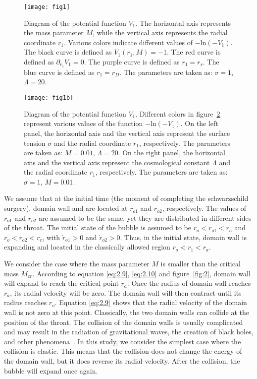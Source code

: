 \documentclass[12pt]{article}
\begin{document}
\begin{figure}[tbp]
\centering
\texttt{[image: fig1]}
\caption{\label{fig:3}Diagram of the potential function $V_{1}$. The horizontal axis represents the mass parameter $M$, while the vertical axis represents the radial coordinate $r_{1}$. Various colors indicate different values of $-\mathrm{ln}(-V_{1})$. The black curve is defined as $V_{1}(r_{1},M)=-1$. The red curve is defined as $\partial_{r_{1}}V_{1}=0$. The purple curve is defined as $r_{1}=r_{s}$. The blue curve is defined as $r_{1}=r_{D}$. The parameters are taken as: $\sigma=1$, $\Lambda=20$. }
\end{figure}

\begin{figure}[tbp]
\centering
\texttt{[image: fig1b]}
\caption{\label{fig:4} Diagram of the potential function $V_{1}$. Different colors in figure~\ref{fig:4} represent various values of the function $-\mathrm{ln}(-V_{1})$. On the left panel, the horizontal axis and the vertical axis represent the surface tension $\sigma$ and the radial coordinate $r_{1}$, respectively. The parameters are taken as: $M=0.01$, $\Lambda=20$. On the right panel, the horizontal axis and the vertical axis represent the cosmological constant $\Lambda$ and the radial coordinate $r_{1}$, respectively. The parameters are taken as: $\sigma=1$, $M=0.01$.}
\end{figure}

We assume that at the initial time (the moment of completing the schwarzschild surgery), domain wall \uppercase\expandafter{} and \uppercase\expandafter{} are located at $r_{o1}$ and $r_{o2}$, respectively. The values of $r_{o1}$ and $r_{o2}$ are assumed to be the same, yet they are distributed in different sides of the throat. The initial state of the bubble is assumed to be  $r_{o}<r_{o1}<r_{a}$ and  $r_{o}<r_{o2}<r_{c}$, with $\dot{r}_{o1}>0$ and $\dot{r}_{o2}>0$. Thus, in the initial state, domain wall \uppercase\expandafter{} is expanding and located in the classically allowed region $r_{o}<r_{1}<r_{a}$.

We consider the case where the mass parameter $M$ is smaller than the critical mass $M_{cr}$. According to equation \eqref{eq:2.9}, \eqref{eq:2.10} and figure~\ref{fig:2}, domain wall \uppercase\expandafter{} will expand to reach the critical point $r_{a}$. Once the radius of domain wall \uppercase\expandafter{} reaches $r_{a}$, its radial velocity will be zero. The domain wall \uppercase\expandafter{} will then contract until its radius reaches  $r_{o}$. Equation \eqref{eq:2.9} shows that the radial velocity of the domain wall  is not zero at this point. Classically, the two domain walls can  collide at the position of the throat. The collision of the domain walls is usually complicated and may result in the radiation of gravitational waves, the creation of black holes, and other phenomena~\cite{ZCW,ST,RTM,JJL1,JJL2,JJL3,RM,MK,TJLE}. In this study, we consider the simplest case where the collision is elastic. This means that the collision does not change the energy of the domain wall, but it does reverse its radial velocity. After the collision, the bubble will expand once again.
\end{document}

